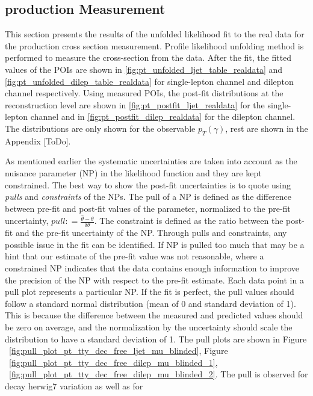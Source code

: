 \subsection{\tty production Measurement}
\label{sec:tty_prod_measurement}

This section presents the results of the unfolded likelihood fit to the real data for the \tty production cross section measurement. Profile likelihood unfolding method is performed to measure the cross-section from the data. %
After the fit, the fitted values of the POIs are shown in \cref{fig:pt_unfolded_ljet_table_realdata} and \cref{fig:pt_unfolded_dilep_table_realdata} for single-lepton channel and dilepton channel respectively. Using measured POIs, the post-fit distributions at the reconstruction level are shown in \cref{fig:pt_postfit_ljet_realdata} for the single-lepton channel and in \cref{fig:pt_postfit_dilep_realdata} for the dilepton channel. The distributions are only shown for the observable $p_T(\gamma)$, rest are shown in the Appendix [ToDo].

As mentioned earlier the systematic uncertainties are taken into account as the nuisance parameter (NP) in the likelihood function and they are kept constrained. The best way to show the post-fit uncertainties is to quote using \textit{pulls} and \textit{constraints} of the NPs. The pull of a NP is defined as the difference between pre-fit and post-fit values of the parameter, normalized to the pre-fit uncertainty, $pull: = \frac{\hat{\theta}- \theta}{\delta \theta}$. The constraint is defined as the ratio between the post-fit and the pre-fit uncertainty of the NP. Through pulls and constraints, any possible issue in the fit can be identified. If NP is pulled too much that may be a hint that our estimate of the pre-fit value was not reasonable, where a constrained NP indicates that the data contains enough information to improve the precision of the NP with respect to the pre-fit estimate.
Each data point in a pull plot represents a particular NP. If the fit is perfect, the pull values should follow a standard normal distribution (mean of 0 and standard deviation of 1). This is because the difference between the measured and predicted values should be zero on average, and the normalization by the uncertainty should scale the distribution to have a standard deviation of 1. The pull plots are shown in Figure ~\ref{fig:pull_plot_pt_tty_dec_free_ljet_mu_blinded}, Figure ~\ref{fig:pull_plot_pt_tty_dec_free_dilep_mu_blinded_1}, ~\ref{fig:pull_plot_pt_tty_dec_free_dilep_mu_blinded_2}. %
The pull is observed for \tty decay herwig7 variation as well as for 

